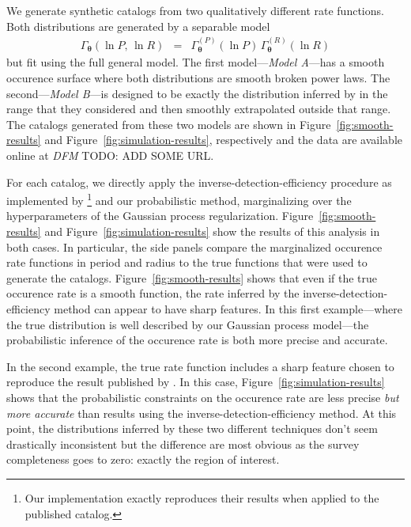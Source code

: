 \documentclass[12pt,preprint]{aastex}
\newcommand{\Fig}[1]{Figure~\ref{fig:#1}}
\newcommand{\fig}[1]{\Fig{#1}}
\newcommand{\bvec}[1]{\ensuremath{\boldsymbol{#1}}}
\newcommand{\todo}[3]{{\color{#2} \emph{#1} TODO: #3}}
\newcommand{\dfmtodo}[1]{\todo{DFM}{red}{#1}}
\newcommand{\rate}{\ensuremath{\Gamma}}
\newcommand{\ratepar}{{\ensuremath{\theta}}}
\newcommand{\ratepars}{{\ensuremath{\bvec{\ratepar}}}}
\newcommand{\radius}{\ensuremath{R}}
\newcommand{\period}{\ensuremath{P}}
\newcommand{\modela}{\emph{Model A}}
\newcommand{\modelb}{\emph{Model B}}
\begin{document}
We generate synthetic catalogs from two qualitatively different rate
functions.
Both distributions are generated by a separable model
\begin{eqnarray}
\rate_\ratepars (\ln\period,\,\ln\radius) &=&
    \rate_\ratepars^{(\period)}(\ln\period)\,
    \rate_\ratepars^{(\radius)}(\ln\radius)
\end{eqnarray}
but fit using the full general model.
The first model---\modela---has a smooth occurence surface where both
distributions are smooth broken power laws.
The second---\modelb---is designed to be exactly the distribution inferred by
\citet{petigura} in the range that they considered and then smoothly
extrapolated outside that range.
The catalogs generated from these two models are shown in \fig{smooth-results}
and \fig{simulation-results}, respectively and the data are available online
at \dfmtodo{ADD SOME URL}.

For each catalog, we directly apply the inverse-detection-efficiency
procedure as implemented by \citealt{petigura}\footnote{Our implementation
exactly reproduces their results when applied to the published catalog.} and
our probabilistic method, marginalizing over the hyperparameters of the
Gaussian process regularization.
\Fig{smooth-results} and \fig{simulation-results} show the results of this
analysis in both cases.
In particular, the side panels compare the marginalized occurence rate
functions in period and radius to the true functions that were used to
generate the catalogs.
\Fig{smooth-results} shows that even if the true occurence rate is a smooth
function, the rate inferred by the inverse-detection-efficiency method can
appear to have sharp features.
In this first example---where the true distribution is well described by our
Gaussian process model---the probabilistic inference of the occurence rate is
both more precise and accurate.

In the second example, the true rate function includes a sharp feature chosen
to reproduce the result published by \citet{petigura}.
In this case, \fig{simulation-results} shows that the probabilistic
constraints on the occurence rate are less precise \emph{but more accurate}
than results using the inverse-detection-efficiency method.
At this point, the distributions inferred by these two different techniques
don't seem drastically inconsistent but the difference are most obvious as the
survey completeness goes to zero: exactly the region of interest.
\end{document}
